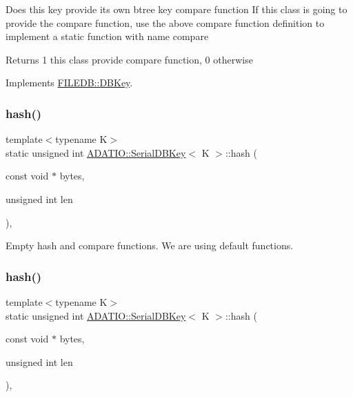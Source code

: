 Does this key provide its own btree key compare function If this class is going to provide the compare function, use the above compare function definition to implement a static function with name compare

\begin{DoxyReturn}{Returns}
1 this class provide compare function, 0 otherwise 
\end{DoxyReturn}


Implements \mbox{\hyperlink{classFILEDB_1_1DBKey_a416c32ba10caf76e6b7ff4986cfc3c05}{F\+I\+L\+E\+D\+B\+::\+D\+B\+Key}}.

\mbox{\label{classADATIO_1_1SerialDBKey_a09904405d7dc203997431c6ca8af87ae}} 
\subsubsection{\texorpdfstring{hash()}{hash()}\hspace{0.1cm}{\footnotesize\ttfamily [1/2]}}
{\footnotesize\ttfamily template$<$typename K$>$ \\
static unsigned int \mbox{\hyperlink{classADATIO_1_1SerialDBKey}{A\+D\+A\+T\+I\+O\+::\+Serial\+D\+B\+Key}}$<$ K $>$\+::hash (\begin{DoxyParamCaption}\item[{const void $\ast$}]{bytes,  }\item[{unsigned int}]{len }\end{DoxyParamCaption})\hspace{0.3cm}{\ttfamily [inline]}, {\ttfamily [static]}}

Empty hash and compare functions. We are using default functions. \mbox{\label{classADATIO_1_1SerialDBKey_a09904405d7dc203997431c6ca8af87ae}} 
\subsubsection{\texorpdfstring{hash()}{hash()}\hspace{0.1cm}{\footnotesize\ttfamily [2/2]}}
{\footnotesize\ttfamily template$<$typename K$>$ \\
static unsigned int \mbox{\hyperlink{classADATIO_1_1SerialDBKey}{A\+D\+A\+T\+I\+O\+::\+Serial\+D\+B\+Key}}$<$ K $>$\+::hash (\begin{DoxyParamCaption}\item[{const void $\ast$}]{bytes,  }\item[{unsigned int}]{len }\end{DoxyParamCaption})\hspace{0.3cm}{\ttfamily [inline]}, {\ttfamily [static]}}

